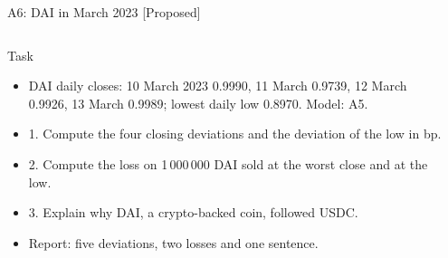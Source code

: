 \begin{frame}{A6: DAI in March 2023 [Proposed]}
\propsub
\itemsize{\scriptsize}
\begin{columns}[T]
\begin{column}{\taskw}
\begin{block}{Task}
\begin{itemize}
    \item DAI daily closes: 10 March 2023 0.9990, 11 March 0.9739, 12 March 0.9926, 13 March 0.9989; lowest daily low 0.8970. Model: A5.
    \item 1. Compute the four closing deviations and the deviation of the low in bp.
    \item 2. Compute the loss on 1\,000\,000 DAI sold at the worst close and at the low.
    \item 3. Explain why DAI, a crypto-backed coin, followed USDC.
    \item Report: five deviations, two losses and one sentence.
\end{itemize}
\end{block}
\end{column}
\begin{column}{\solw}
\end{column}
\end{columns}
\end{frame}

